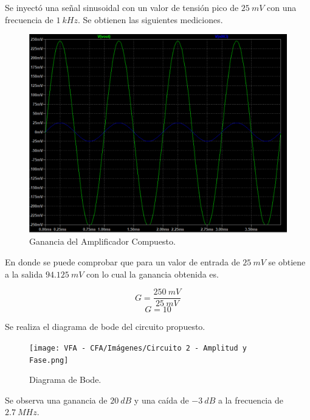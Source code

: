 \hspace{1mm} Se inyectó una señal sinusoidal con un valor de tensión pico de \(25~mV\) con una frecuencia de \( 1~kHz \).  Se obtienen las siguientes mediciones.
\begin{figure}[!h]
    \centering
    \includegraphics[width=0.6\linewidth]{VFA - CFA/Imágenes/Circuito 2 - Simulación.png}
    \caption{Ganancia del Amplificador Compuesto.}
\end{figure}
\hspace{1mm} En donde se puede comprobar que para un valor de entrada de \( 25~mV \) se obtiene a la salida \( 94.125~mV \) con lo cual la ganancia obtenida es.

\begin{equation}
    G = \frac{250~mV}{25~mV}
\end{equation}
\begin{equation}
    \boxed{
    G = 10
    }
\end{equation}

\hspace{1mm} Se realiza el diagrama de bode del circuito propuesto. 
\begin{figure}[!h]
    \centering
    \texttt{[image: VFA - CFA/Imágenes/Circuito 2 - Amplitud y Fase.png]}
    \caption{Diagrama de Bode.}
\end{figure}
\hspace{1mm} Se observa una ganancia de \(20~dB\) y una caída de \(-3~dB\) a la frecuencia de \(2.7~MHz\).






